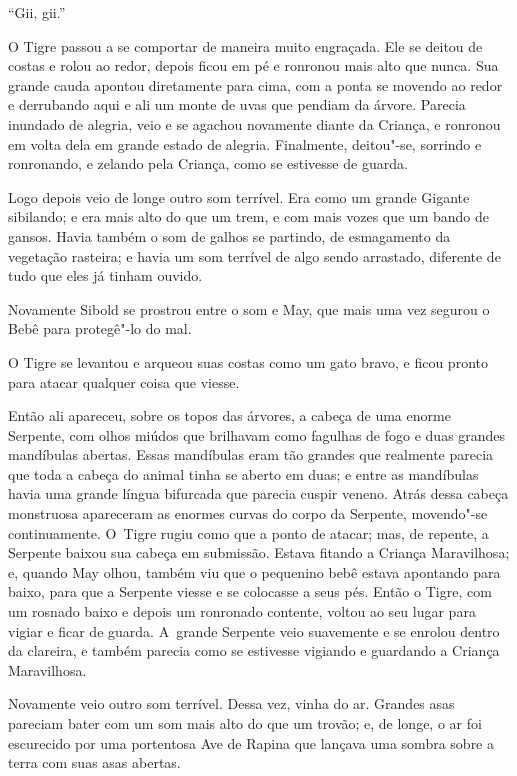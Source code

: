 ``Gii, gii.''

O Tigre passou a se comportar de maneira muito engraçada. Ele se deitou
de costas e rolou ao redor, depois ficou em pé e ronronou mais alto que
nunca. Sua grande cauda apontou diretamente para cima, com a ponta se
movendo ao redor e derrubando aqui e ali um monte de uvas que pendiam da
árvore. Parecia inundado de alegria, veio e se agachou novamente
diante da Criança, e ronronou em volta dela em grande estado de alegria.
Finalmente, deitou"-se, sorrindo e ronronando, e zelando pela Criança,
como se estivesse de guarda.

Logo depois veio de longe outro som terrível. Era como um grande Gigante
sibilando; e era mais alto do que um trem, e com mais vozes que um bando
de gansos. Havia também o som de galhos se partindo, de esmagamento da
vegetação rasteira; e havia um som terrível de algo sendo arrastado,
diferente de tudo que eles já tinham ouvido.

Novamente Sibold se prostrou entre o som e May, que mais uma vez segurou
o Bebê para protegê"-lo do mal.

O Tigre se levantou e arqueou suas costas como um gato bravo, e ficou
pronto para atacar qualquer coisa que viesse.

Então ali apareceu, sobre os topos das árvores, a cabeça de uma enorme
Serpente, com olhos miúdos que brilhavam como fagulhas de fogo e duas
grandes mandíbulas abertas. Essas mandíbulas eram tão grandes que
realmente parecia que toda a cabeça do animal tinha se aberto em duas; e
entre as mandíbulas havia uma grande língua bifurcada que parecia cuspir
veneno. Atrás dessa cabeça monstruosa apareceram as enormes curvas do
corpo da Serpente, movendo"-se continuamente. O~Tigre rugiu como que a
ponto de atacar; mas, de repente, a Serpente baixou sua cabeça em
submissão. Estava fitando a Criança Maravilhosa; e, quando May olhou,
também viu que o pequenino bebê estava apontando para baixo, para que a Serpente viesse e se colocasse a seus pés. Então o Tigre, com um rosnado baixo
e depois um ronronado contente, voltou ao seu lugar para vigiar e ficar
de guarda. A~grande Serpente veio suavemente e se enrolou dentro da
clareira, e também parecia como se estivesse vigiando e guardando a
Criança Maravilhosa.

Novamente veio outro som terrível. Dessa vez, vinha do ar. Grandes asas
pareciam bater com um som mais alto do que um trovão; e, de longe, o ar
foi escurecido por uma portentosa Ave de Rapina que lançava uma sombra
sobre a terra com suas asas abertas.

